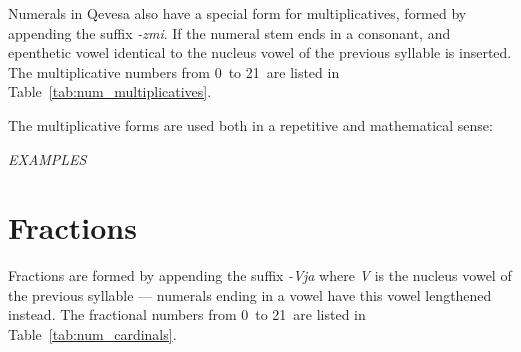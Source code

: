 \documentclass[grammar]{subfiles}
\begin{document}
	Numerals in Qevesa also have a special form for multiplicatives, formed by appending the suffix \emph{-zmi}. If the numeral stem ends in a consonant, and epenthetic vowel identical to the nucleus vowel of the previous syllable is inserted. The multiplicative numbers from 0\dec\ to 21\dec\ are listed in Table~\ref{tab:num_multiplicatives}.
	
	\begin{table}[htpb]\small\capstart
		\begin{center}
			\qquad
			\caption{Multiplicative numerals from 0\dec\ to 21\dec\label{tab:num_multiplicatives}}
		\end{center}
	\end{table}

	The multiplicative forms are used both in a repetitive and mathematical sense:

	\begin{exe}
		\ex \emph{EXAMPLES}
	\end{exe}

	\section{Fractions}
	\label{sec:num_fractions}

	Fractions are formed by appending the suffix \emph{-Vja} where \emph{V} is the nucleus vowel of the previous syllable — numerals ending in a vowel have this vowel lengthened instead. The fractional numbers from 0\dec\ to 21\dec\ are listed in Table~\ref{tab:num_cardinals}.
	
\end{document}

